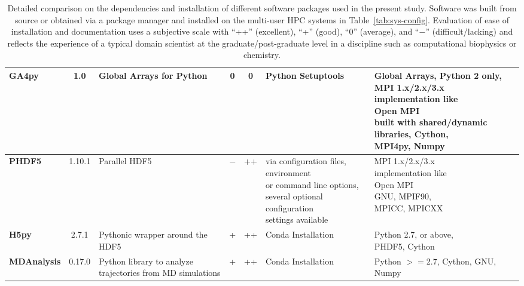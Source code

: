 \begin{table}[ht!]
\begin{adjustbox}{max width=\textwidth}
\begin{tabular}{l c l c c l l}
   \midrule
   \bfseries GA4py & 1.0 & Global Arrays for Python & 0 & 0 & Python Setuptools &\makecell[l]{Global Arrays, Python 2 only,\\ MPI 1.x/2.x/3.x  \\implementation like \\ Open MPI \\ built with shared/dynamic \\libraries, Cython,  \\MPI4py, Numpy} \\
   \midrule
   \bfseries PHDF5 & 1.10.1 & Parallel HDF5 & $-$ & ++ & \makecell[l]{via configuration files,\\ environment \\or command line options, \\ several optional configuration\\ settings available} &\makecell[l]{MPI 1.x/2.x/3.x  \\ implementation like \\ Open MPI  \\GNU, MPIF90,  \\MPICC, MPICXX}\\
   \midrule
   \bfseries H5py &  2.7.1 & Pythonic wrapper around the HDF5 & + & ++ & Conda Installation & \makecell[l]{Python 2.7, or above,\\ PHDF5, Cython}\\    
   \midrule
   \bfseries MDAnalysis & 0.17.0 & \makecell[l]{Python library to analyze \\trajectories from MD simulations} & + & ++ & Conda Installation & \makecell[l]{Python $>=$2.7, Cython,\\ GNU, Numpy}\\
  \bottomrule
\end{tabular}
\end{adjustbox}
\caption[Version of the packages used in the present study]%
{Detailed comparison on the dependencies and installation of different software packages used in the present study. Software was built from source or obtained via a package manager and installed on the multi-user HPC systems in Table~\protect\ref{tab:sys-config}. Evaluation of ease of installation and documentation uses a subjective scale with ``++'' (excellent), ``+'' (good), ``0'' (average), and ``$-$'' (difficult/lacking) and reflects the experience of a typical domain scientist at the graduate/post-graduate level in a discipline such as computational biophysics or chemistry.}
\label{tab:version}
\end{table}


